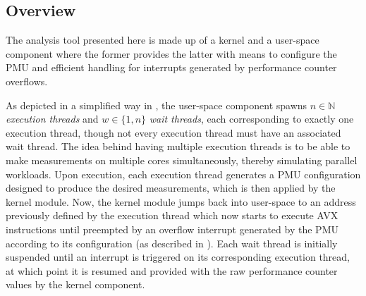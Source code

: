 \subsection{Overview}
\label{sec:analysis:design:overview}

The analysis tool presented here is made up of a kernel and a user-space component where the former provides the latter with means to configure the \gls{PMU} and efficient handling for interrupts generated by performance counter overflows.

As depicted in a simplified way in , the user-space component spawns $n\in\mathbb{N}$ \textit{execution threads} and $w\in\{1,n\}$ \textit{wait threads}, each corresponding to exactly one execution thread, though not every execution thread must have an associated wait thread. The idea behind having multiple execution threads is to be able to make measurements on multiple cores simultaneously, thereby simulating parallel workloads. Upon execution, each execution thread generates a \gls{PMU} configuration designed to produce the desired measurements, which is then applied by the kernel module. Now, the kernel module jumps back into user-space to an address previously defined by the execution thread which now starts to execute \gls{AVX} instructions until preempted by an overflow interrupt generated by the \gls{PMU} according to its configuration (as described in ). Each wait thread is initially suspended until an interrupt is triggered on its corresponding execution thread, at which point it is resumed and provided with the raw performance counter values by the kernel component.

